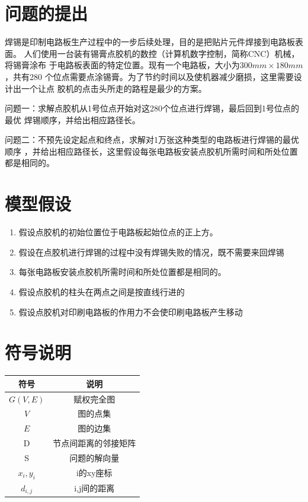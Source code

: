 \documentclass[fontset=windows,a4paper,12pt]{ctexart}
\begin{document}
  \newpage
  \tableofcontents
  \newpage
  \section{问题的提出}
    焊锡是印制电路板生产过程中的一步后续处理，目的是把贴片元件焊接到电路板表面。
    人们使用一台装有锡膏点胶机的数控（计算机数字控制，简称CNC）机械，将锡膏涂布
    于电路板表面的特定位置。现有一个电路板，大小为$300mm\times180mm$，共有280
    个位点需要点涂锡膏。为了节约时间以及使机器减少磨损，这里需要设计出一个让点
    胶机的点击头所走的路程是最少的方案。

    问题一：求解点胶机从1号位点开始对这280个位点进行焊锡，最后回到1号位点的最优
    焊锡顺序，并给出相应路径长。

    问题二：不预先设定起点和终点，求解对1万张这种类型的电路板进行焊锡的最优顺序
    ，并给出相应路径长，这里假设每张电路板安装点胶机所需时间和所处位置都是相同的。
  \section{模型假设}
    \begin{enumerate}
      \item 假设点胶机的初始位置位于电路板起始位点的正上方。
      \item 假设在点胶机进行焊锡的过程中没有焊锡失败的情况，既不需要来回焊锡
      \item 每张电路板安装点胶机所需时间和所处位置都是相同的。
      \item 假设点胶机的柱头在两点之间是按直线行进的
      \item 假设点胶机对印刷电路板的作用力不会使印刷电路板产生移动
    \end{enumerate}
  \section{符号说明}
    \begin{center}
	  \begin{tabular}{|c|c|}
	  	\hline
	  	符号 & 说明 \\ 
	  	\hline 
	  	$G(V,E)$	&	赋权完全图\\
	  	$V$		& 图的点集\\
	  	$E$		& 图的边集\\
	  	D	&	节点间距离的邻接矩阵\\
	  	S	&	问题的解向量\\
	  	$x_i,y_i$	& i的xy座标\\
	  	$d_{i,j}$ & i,j间的距离\\
	  	\hline
	  \end{tabular} 
	\end{center}
\end{document}
